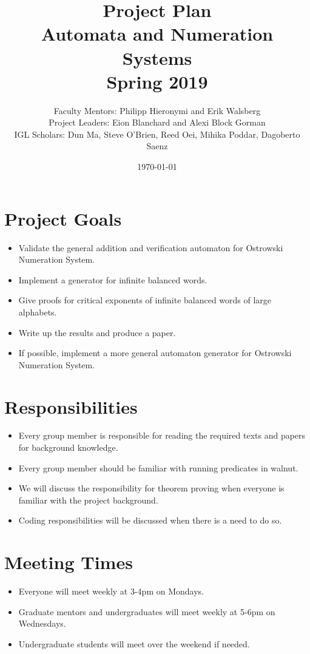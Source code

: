 \documentclass[12pt]{article}
\begin{document}
\title{Project Plan\\ {Automata and Numeration Systems} \\Spring 2019}
\author{Faculty Mentors: {Philipp Hieronymi and Erik Walsberg} \\
	Project Leaders: {Eion Blanchard and Alexi Block Gorman}\\
	IGL Scholars: {Dun Ma, Steve O'Brien, Reed Oei, Mihika Poddar, Dagoberto Saenz }}
\date{\today}
\maketitle
\section{Project Goals}
\begin{itemize} 
\item Validate the general addition and verification automaton for Ostrowski Numeration System. 
\item Implement a generator for infinite balanced words. 
\item Give proofs for critical exponents of infinite balanced words of large alphabets. 
\item Write up the results and produce a paper. 
\item If possible, implement a more general automaton generator for Ostrowski Numeration System. 
\end{itemize}

\section{Responsibilities}
\begin{itemize}
\item Every group member is responsible for reading the required texts and papers for background knowledge.
\item Every group member should be familiar with running predicates in walnut. 
\item We will discuss the responsibility for theorem proving when everyone is familiar with the project background.
\item Coding responsibilities will be discussed when there is a need to do so. 

\end{itemize}

\section{Meeting Times}
\begin{itemize}
	\item Everyone will meet weekly at 3-4pm on Mondays.
	\item Graduate mentors and undergraduates will meet weekly at 5-6pm on Wednesdays.
	\item Undergraduate students will meet over the weekend if needed. 
\end{itemize}
\end{document}
